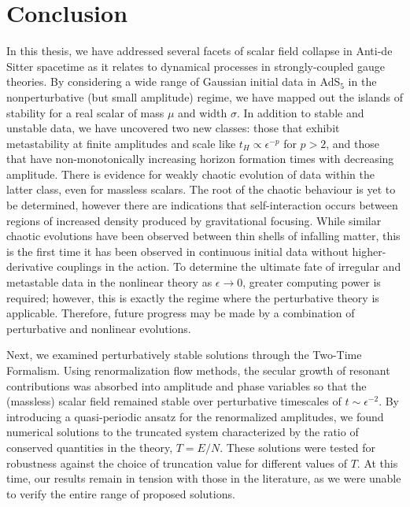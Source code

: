 \documentclass[../PhD.tex]{subfiles}
\begin{document}

\chapter{Conclusion}
\label{ch: conclusion}

In this thesis, we have addressed several facets of scalar field collapse in Anti-de Sitter spacetime as it relates to dynamical processes in strongly-coupled gauge theories. By considering a wide range of Gaussian initial data in AdS$_5$ in the nonperturbative (but small amplitude) regime, we have mapped out the islands of stability for a real scalar of mass $\mu$ and width $\sigma$. In addition to stable and unstable data, we have uncovered two new classes: those that exhibit metastability at finite amplitudes and scale like $t_H \propto \epsilon^{-p}$ for $p > 2$, and those that have non-monotonically increasing horizon formation times with decreasing amplitude. There is evidence for weakly chaotic evolution of data within the latter class, even for massless scalars. The root of the chaotic behaviour is yet to be determined, however there are indications that self-interaction occurs between regions of increased density produced by gravitational focusing. While similar chaotic evolutions have been observed between thin shells of infalling matter, this is the first time it has been observed in continuous initial data without higher-derivative couplings in the action. To determine the ultimate fate of irregular and metastable data in the nonlinear theory as $\epsilon \to 0$, greater computing power is required; however, this is exactly the regime where the perturbative theory is applicable. Therefore, future progress may be made by a combination of perturbative and nonlinear evolutions.

Next, we examined perturbatively stable solutions through the Two-Time Formalism. Using renormalization flow methods, the secular growth of resonant contributions was absorbed into amplitude and phase variables so that the (massless) scalar field remained stable over perturbative timescales of $t \sim \epsilon^{-2}$. By introducing a quasi-periodic ansatz for the renormalized amplitudes, we found numerical solutions to the truncated system characterized by the ratio of conserved quantities in the theory, $T = E/N$. These solutions were tested for robustness against the choice of truncation value for different values of $T$. At this time, our results remain in tension with those in the literature, as we were unable to verify the entire range of proposed solutions. 
\end{document}
